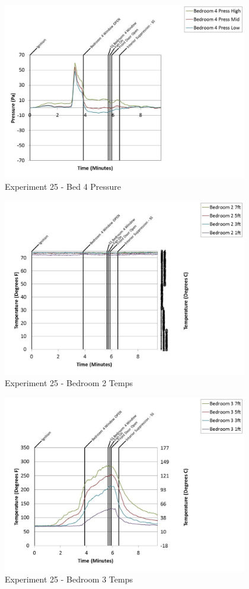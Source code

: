 \documentclass{article}
\begin{document}
\begin{appendices}
	\clearpage

	\begin{figure}[h!]
		\centering
		\includegraphics[height=3.05in]{0_Images/Results_Charts/Exp_25_Charts/Bed4Pressure.pdf}
		\caption{Experiment 25 - Bed 4 Pressure}
	\end{figure}
 

	\begin{figure}[h!]
		\centering
		\includegraphics[height=3.05in]{0_Images/Results_Charts/Exp_25_Charts/Bedroom2Temps.pdf}
		\caption{Experiment 25 - Bedroom 2 Temps}
	\end{figure}
 
	\clearpage

	\begin{figure}[h!]
		\centering
		\includegraphics[height=3.05in]{0_Images/Results_Charts/Exp_25_Charts/Bedroom3Temps.pdf}
		\caption{Experiment 25 - Bedroom 3 Temps}
	\end{figure}
 


\end{appendices}
\end{document}
